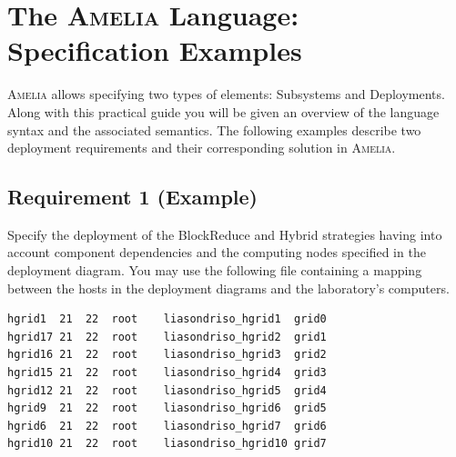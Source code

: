 \documentclass{article}
\newcommand\amelia[0]{\textsc{Amelia}}
\begin{document}

\section{The \amelia{} Language: Specification Examples}

\amelia{} allows specifying two types of elements: Subsystems and Deployments. Along with this
practical guide you will be given an overview of the language syntax and the associated semantics. The following examples describe two deployment requirements and their corresponding solution in \amelia{}.

\subsection{Requirement 1 (Example)}
\label{subsect:apx-amelia-example-1}

Specify the deployment of the BlockReduce and Hybrid strategies having into account component dependencies and the computing nodes specified in the deployment diagram. You may use the following file containing a mapping between the hosts in the deployment diagrams and the laboratory's computers. \\

\begin{lstlisting}[style=common,caption=hosts.txt]
hgrid1	21	22	root	liasondriso_hgrid1	grid0
hgrid17	21	22	root	liasondriso_hgrid2	grid1
hgrid16	21	22	root	liasondriso_hgrid3	grid2
hgrid15	21	22	root	liasondriso_hgrid4	grid3
hgrid12	21	22	root	liasondriso_hgrid5	grid4
hgrid9	21	22	root	liasondriso_hgrid6	grid5
hgrid6	21	22	root	liasondriso_hgrid7	grid6
hgrid10	21	22	root	liasondriso_hgrid10	grid7
\end{lstlisting}
\end{document}

